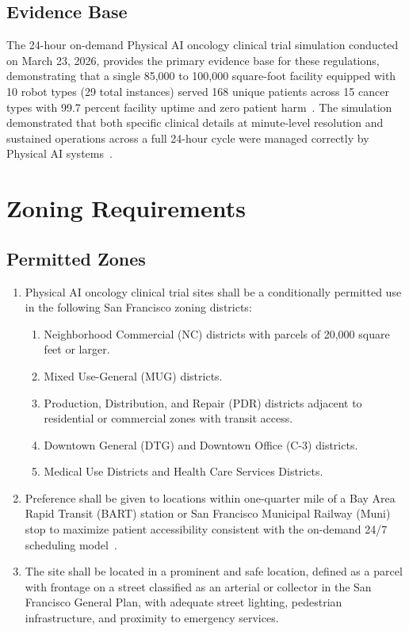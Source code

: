 \documentclass[11pt,letterpaper]{article}
\begin{document}
\subsection{Evidence Base}

The 24-hour on-demand Physical AI oncology clinical trial simulation conducted
on March 23, 2026, provides the primary evidence base for these regulations,
demonstrating that a single 85,000 to 100,000 square-foot facility equipped
with 10 robot types (29 total instances) served 168 unique patients across 15
cancer types with 99.7 percent facility uptime and zero patient
harm~\cite{newtrial2026}. The simulation demonstrated that both specific
clinical details at minute-level resolution and sustained operations across a
full 24-hour cycle were managed correctly by Physical AI
systems~\cite{newtrial2026}.

\section{Zoning Requirements}

\subsection{Permitted Zones}

\begin{enumerate}[label=(\alph*)]
\item Physical AI oncology clinical trial sites shall be a conditionally
  permitted use in the following San Francisco zoning districts:
  \begin{enumerate}[label=(\arabic*)]
  \item Neighborhood Commercial (NC) districts with parcels of 20,000 square
    feet or larger.
  \item Mixed Use-General (MUG) districts.
  \item Production, Distribution, and Repair (PDR) districts adjacent to
    residential or commercial zones with transit access.
  \item Downtown General (DTG) and Downtown Office (C-3) districts.
  \item Medical Use Districts and Health Care Services Districts.
  \end{enumerate}

\item Preference shall be given to locations within one-quarter mile of a Bay
  Area Rapid Transit (BART) station or San Francisco Municipal Railway (Muni)
  stop to maximize patient accessibility consistent with the on-demand 24/7
  scheduling model~\cite{formatcomparison2026}.

\item The site shall be located in a prominent and safe location, defined as a
  parcel with frontage on a street classified as an arterial or collector in
  the San Francisco General Plan, with adequate street lighting, pedestrian
  infrastructure, and proximity to emergency services.
\end{enumerate}
\end{document}
